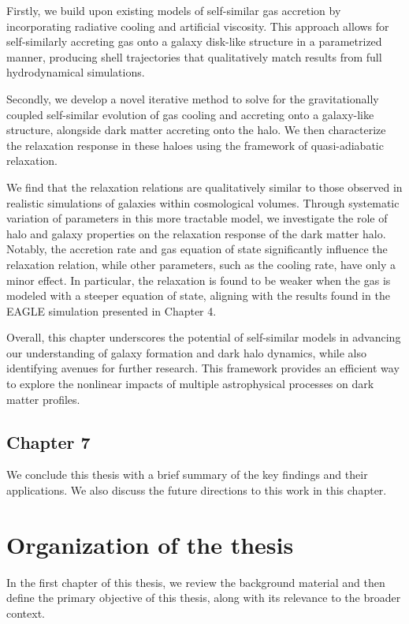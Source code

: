 \documentclass[a4paper, 12pt, oneside]{Thesis}  %
\begin{document}
Firstly, we build upon existing models of self-similar gas accretion by incorporating radiative cooling and artificial viscosity. This approach allows for self-similarly accreting gas onto a galaxy disk-like structure in a parametrized manner, producing shell trajectories that qualitatively match results from full hydrodynamical simulations.

Secondly, we develop a novel iterative method to solve for the gravitationally coupled self-similar evolution of gas cooling and accreting onto a galaxy-like structure, alongside dark matter accreting onto the halo. We then characterize the relaxation response in these haloes using the framework of quasi-adiabatic relaxation.

We find that the relaxation relations are qualitatively similar to those observed in realistic simulations of galaxies within cosmological volumes. Through systematic variation of parameters in this more tractable model, we investigate the role of halo and galaxy properties on the relaxation response of the dark matter halo. Notably, the accretion rate and gas equation of state significantly influence the relaxation relation, while other parameters, such as the cooling rate, have only a minor effect. In particular, the relaxation is found to be weaker when the gas is modeled with a steeper equation of state, aligning with the results found in the EAGLE simulation presented in Chapter 4.

Overall, this chapter underscores the potential of self-similar models in advancing our understanding of galaxy formation and dark halo dynamics, while also identifying avenues for further research. This framework provides an efficient way to explore the nonlinear impacts of multiple astrophysical processes on dark matter profiles.


\subsection*{Chapter 7}
We conclude this thesis with a brief summary of the key findings and their applications. We also discuss the future directions to this work in this chapter.


\section*{Organization of the thesis}

In the first chapter of this thesis, we review the background material and then define the primary objective of this thesis, along with its relevance to the broader context.
\end{document}

